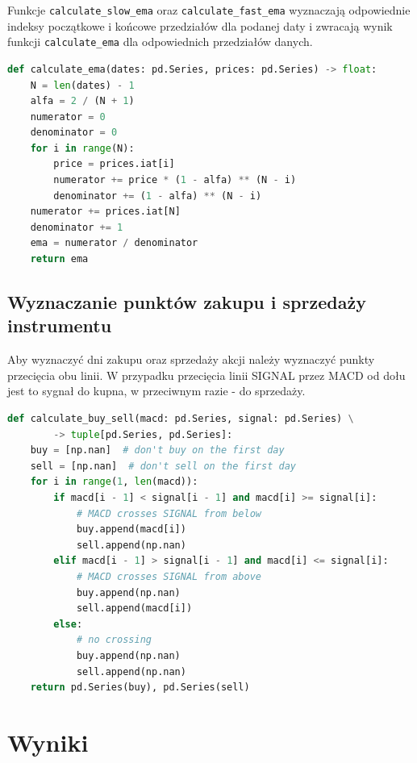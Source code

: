 \documentclass{article}
\begin{document}
Funkcje \lstinline{calculate_slow_ema} oraz \lstinline{calculate_fast_ema} wyznaczają odpowiednie indeksy początkowe i końcowe przedziałów dla podanej daty i zwracają wynik funkcji \lstinline{calculate_ema} dla odpowiednich przedziałów danych.

\begin{lstlisting}[language=Python, caption=Funkcja obliczająca wartość $EMA_N$, captionpos=b]
def calculate_ema(dates: pd.Series, prices: pd.Series) -> float:
    N = len(dates) - 1
    alfa = 2 / (N + 1)
    numerator = 0
    denominator = 0
    for i in range(N):
        price = prices.iat[i]
        numerator += price * (1 - alfa) ** (N - i)
        denominator += (1 - alfa) ** (N - i)
    numerator += prices.iat[N]
    denominator += 1
    ema = numerator / denominator
    return ema
\end{lstlisting}

\subsection{Wyznaczanie punktów zakupu i sprzedaży instrumentu}

Aby wyznaczyć dni zakupu oraz sprzedaży akcji należy wyznaczyć punkty przecięcia obu linii. W przypadku przecięcia linii SIGNAL przez MACD od dołu jest to sygnał do kupna, w przeciwnym razie - do sprzedaży.

\begin{lstlisting}[language=Python, caption=Funkcja wyznczająca punkty przecięcia MACD i SIGNAL, captionpos=b]
def calculate_buy_sell(macd: pd.Series, signal: pd.Series) \
        -> tuple[pd.Series, pd.Series]:
    buy = [np.nan]  # don't buy on the first day
    sell = [np.nan]  # don't sell on the first day
    for i in range(1, len(macd)):
        if macd[i - 1] < signal[i - 1] and macd[i] >= signal[i]:
            # MACD crosses SIGNAL from below
            buy.append(macd[i])
            sell.append(np.nan)
        elif macd[i - 1] > signal[i - 1] and macd[i] <= signal[i]:
            # MACD crosses SIGNAL from above
            buy.append(np.nan)
            sell.append(macd[i])
        else:
            # no crossing
            buy.append(np.nan)
            sell.append(np.nan)
    return pd.Series(buy), pd.Series(sell)
\end{lstlisting}

\section{Wyniki}
\end{document}
